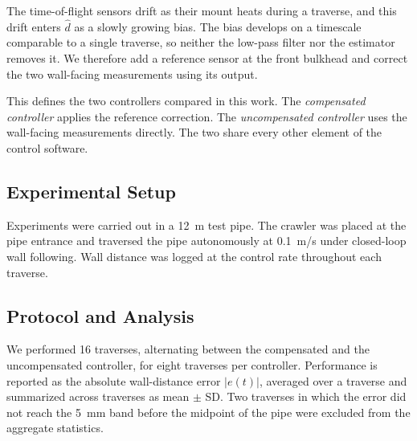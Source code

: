 The time-of-flight sensors drift as their mount heats during a traverse, and this drift
enters $\hat{d}$ as a slowly growing bias. The bias develops on a timescale comparable
to a single traverse, so neither the low-pass filter nor the estimator removes it. We
therefore add a reference sensor at the front bulkhead and correct the two wall-facing
measurements using its output.

This defines the two controllers compared in this work. The \emph{compensated
controller} applies the reference correction. The \emph{uncompensated controller} uses
the wall-facing measurements directly. The two share every other element of the control
software.

\subsection{Experimental Setup}

Experiments were carried out in a 12~m test pipe. The crawler was placed at the pipe
entrance and traversed the pipe autonomously at 0.1~m/s under closed-loop wall
following. Wall distance was logged at the control rate throughout each traverse.

\subsection{Protocol and Analysis}

We performed 16 traverses, alternating between the compensated and the uncompensated
controller, for eight traverses per controller. Performance is reported as the absolute
wall-distance error $|e(t)|$, averaged over a traverse and summarized across traverses
as mean $\pm$ SD. Two traverses in which the error did not reach the 5~mm band before
the midpoint of the pipe were excluded from the aggregate statistics.

